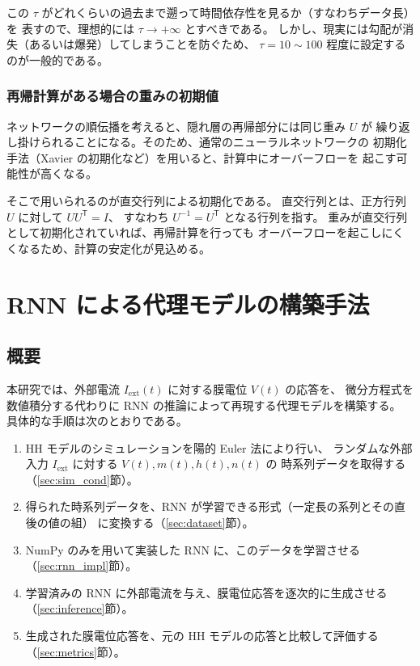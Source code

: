 \documentclass[a4paper,11pt,openany]{ltjsreport}
\newcommand{\Iext}{I_{\mathrm{ext}}}
\begin{document}
この $\tau$ がどれくらいの過去まで遡って時間依存性を見るか（すなわちデータ長）を
表すので、理想的には $\tau \to +\infty$ とすべきである。
しかし、現実には勾配が消失（あるいは爆発）してしまうことを防ぐため、
$\tau = 10 \sim 100$ 程度に設定するのが一般的である\cite{sugomori2019}。

\subsection{再帰計算がある場合の重みの初期値}

ネットワークの順伝播を考えると、隠れ層の再帰部分には同じ重み $U$ が
繰り返し掛けられることになる。そのため、通常のニューラルネットワークの
初期化手法（Xavier の初期化など）を用いると、計算中にオーバーフローを
起こす可能性が高くなる。

そこで用いられるのが直交行列による初期化である\cite{saxe2014}。
直交行列とは、正方行列 $U$ に対して $UU^{\mathsf{T}} = I$、
すなわち $U^{-1} = U^{\mathsf{T}}$ となる行列を指す。
重みが直交行列として初期化されていれば、再帰計算を行っても
オーバーフローを起こしにくくなるため、計算の安定化が見込める。

\chapter{RNN による代理モデルの構築手法}

\section{概要}

本研究では、外部電流 $\Iext(t)$ に対する膜電位 $V(t)$ の応答を、
微分方程式を数値積分する代わりに RNN の推論によって再現する代理モデルを構築する。
具体的な手順は次のとおりである。

\begin{enumerate}
  \item HH モデルのシミュレーションを陽的 Euler 法により行い、
        ランダムな外部入力 $\Iext$ に対する $V(t), m(t), h(t), n(t)$ の
        時系列データを取得する（\ref{sec:sim_cond}節）。
  \item 得られた時系列データを、RNN が学習できる形式（一定長の系列とその直後の値の組）
        に変換する（\ref{sec:dataset}節）。
  \item NumPy のみを用いて実装した RNN に、このデータを学習させる（\ref{sec:rnn_impl}節）。
  \item 学習済みの RNN に外部電流を与え、膜電位応答を逐次的に生成させる
        （\ref{sec:inference}節）。
  \item 生成された膜電位応答を、元の HH モデルの応答と比較して評価する
        （\ref{sec:metrics}節）。
\end{enumerate}
\end{document}

